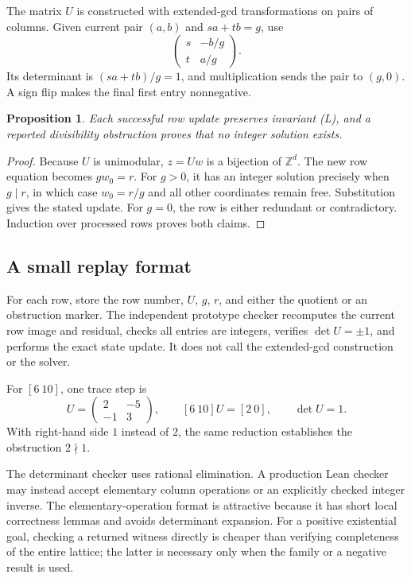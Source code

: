 \documentclass[11pt,a4paper]{article}
\newtheorem{proposition}{Proposition}[section]
\newcommand{\Z}{\mathbb{Z}}
\begin{document}
The matrix $U$ is constructed with extended-gcd transformations on pairs of columns. Given current pair $(a,b)$ and $sa+tb=g$, use
\[
\begin{pmatrix}s&-b/g\\t&a/g\end{pmatrix}.
\]
Its determinant is $(sa+tb)/g=1$, and multiplication sends the pair to $(g,0)$. A sign flip makes the final first entry nonnegative.

\begin{proposition}
Each successful row update preserves invariant \textnormal{(L)}, and a reported divisibility obstruction proves that no integer solution exists.
\end{proposition}
\begin{proof}
Because $U$ is unimodular, $z=Uw$ is a bijection of $\Z^d$. The new row equation becomes $gw_0=r$. For $g>0$, it has an integer solution precisely when $g\mid r$, in which case $w_0=r/g$ and all other coordinates remain free. Substitution gives the stated update. For $g=0$, the row is either redundant or contradictory. Induction over processed rows proves both claims.
\end{proof}

\subsection{A small replay format}

For each row, store the row number, $U$, $g$, $r$, and either the quotient or an obstruction marker. The independent prototype checker recomputes the current row image and residual, checks all entries are integers, verifies $\det U=\pm1$, and performs the exact state update. It does not call the extended-gcd construction or the solver.

For $[6\ 10]$, one trace step is
\[
U=\begin{pmatrix}2&-5\\-1&3\end{pmatrix},\qquad
[6\ 10]U=[2\ 0],\qquad \det U=1.
\]
With right-hand side $1$ instead of $2$, the same reduction establishes the obstruction $2\nmid1$.

The determinant checker uses rational elimination. A production Lean checker may instead accept elementary column operations or an explicitly checked integer inverse. The elementary-operation format is attractive because it has short local correctness lemmas and avoids determinant expansion. For a positive existential goal, checking a returned witness directly is cheaper than verifying completeness of the entire lattice; the latter is necessary only when the family or a negative result is used.
\end{document}

